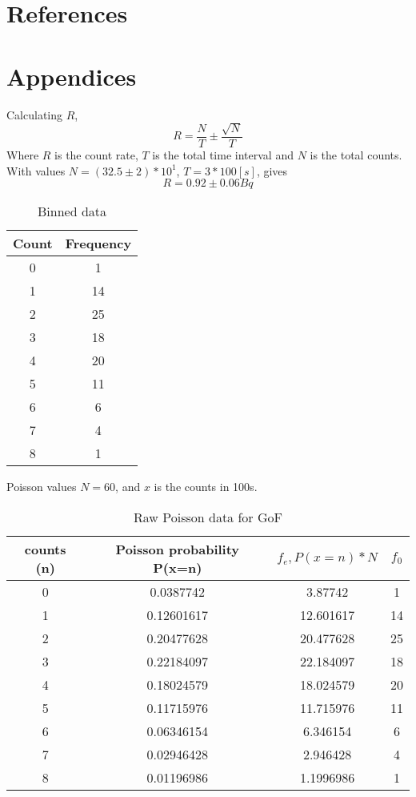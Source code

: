 \documentclass[11pt]{article}
\begin{document}
    \section{References}

    \section{Appendices}
    Calculating $R$, $$ R = \frac{N}{T} \pm \frac{\sqrt{N}}{T}$$
  Where $R$ is the count rate, $T$ is the total time interval and $N$ is the total counts. With values $N =( 32.5 \pm 2) * 10^{1}$, $T= 3 * 100 [s]$, gives 
  $$R = 0.92 \pm 0.06  Bq$$ 
    \begin{table}[b]
        \centering
        \begin{tabular}{|c|c|}
        \hline
          \textbf{Count}  & \textbf{Frequency} \\
          \hline
           0  & 1 \\
           1 & 14\\
           2  & 25 \\
           3  & 18 \\
           4  & 20 \\
           5  & 11 \\
           6  & 6\\
           7  & 4 \\
           8  & 1 \\
           
           \hline
        \end{tabular}
        \caption{Binned data}
        \label{tab:my_label}
    \end{table}
    Poisson values 
    $N = 60$, and $x$ is the counts in 100s. 
    \begin{table}[]
        \centering
        \begin{tabular}{|c|c|c|c|}
         \hline
           counts (n)  & Poisson probability P(x=n) & $ f_{e}, P(x=n) * N$ & $f_{0}$ \\
            \hline
            0 & 0.0387742 & 3.87742 & 1 \\
            1 & 0.12601617 & 12.601617 & 14\\
            2 & 0.20477628 & 20.477628 & 25\\
            3 & 0.22184097 & 22.184097 & 18\\
            4 & 0.18024579 & 18.024579 & 20\\
            5 & 0.11715976 & 11.715976 & 11\\
            6 & 0.06346154 & 6.346154 & 6 \\
            7 & 0.02946428 & 2.946428 & 4\\
            8 & 0.01196986 & 1.1996986 & 1\\
             \hline

        \end{tabular}
        \caption{Raw Poisson data for GoF}
        \label{tab:my_label}
    \end{table}
\end{document}
